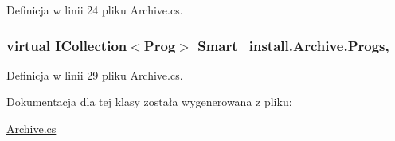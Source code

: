 Definicja w linii 24 pliku Archive.\+cs.

\hypertarget{class_smart__install_1_1_archive_aee224a0c3036cd495e63818a2efa4218}{
\subsubsection[{Progs}]{\setlength{\rightskip}{0pt plus 5cm}virtual I\+Collection$<${\bf Prog}$>$ Smart\+\_\+install.\+Archive.\+Progs\hspace{0.3cm}{\ttfamily [get]}, {\ttfamily [set]}}}\label{class_smart__install_1_1_archive_aee224a0c3036cd495e63818a2efa4218}


Definicja w linii 29 pliku Archive.\+cs.



Dokumentacja dla tej klasy została wygenerowana z pliku\+:\begin{DoxyCompactItemize}
\item 
\hyperlink{_archive_8cs}{Archive.\+cs}\end{DoxyCompactItemize}
